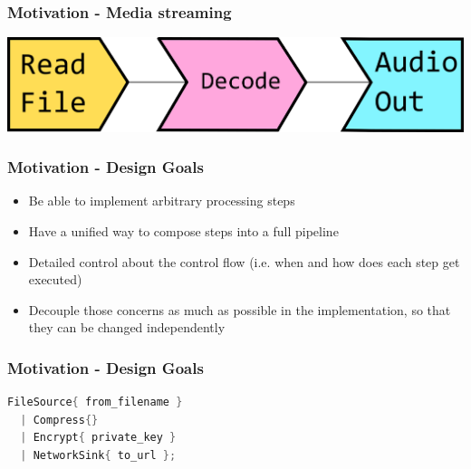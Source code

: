 \documentclass[aspectratio=169]{beamer}
\begin{document}
\begin{frame}[fragile]
  \frametitle{Motivation - Media streaming}
  \includegraphics[width=.9\textwidth]{pipelinesgfx/pipe_media_streaming_full.png}
\end{frame}

\begin{frame}
  \frametitle{Motivation - Design Goals}
  
  \begin{itemize}
  \item Be able to implement arbitrary processing steps
  \item Have a unified way to compose steps into a full pipeline
  \item Detailed control about the control flow (i.e. when and how does each step get executed)
  \item Decouple those concerns as much as possible in the implementation, so that they can be changed independently
  \end{itemize}
\end{frame}

\begin{frame}[fragile]
  \frametitle{Motivation - Design Goals}
  \begin{lstlisting}[language={C++}]
FileSource{ from_filename }
  | Compress{}
  | Encrypt{ private_key }
  | NetworkSink{ to_url };
  \end{lstlisting}
\end{frame}
\end{document}
